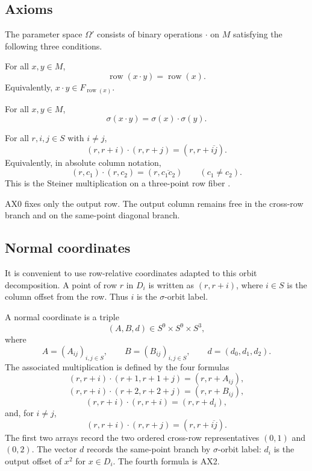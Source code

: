 \documentclass[11pt]{article}
\theoremstyle{definition}
\begin{document}
\subsection{Axioms}\label{axioms}

The parameter space \(\Omega'\) consists of binary operations \(\cdot\) on \(M\)
satisfying the following three conditions.

\begin{description}[leftmargin=3.2em,style=nextline]
\item[AX0, left-row output.]
For all \(x,y\in M\),
\[
\operatorname{row}(x\cdot y)=\operatorname{row}(x).
\]
Equivalently, \(x\cdot y\in F_{\operatorname{row}(x)}\).

\item[\(\sigma\)-equivariance.]
For all \(x,y\in M\),
\[
\sigma(x\cdot y)=\sigma(x)\cdot \sigma(y).
\]

\item[AX2, same-row off-diagonal Steiner rule.]
For all \(r,i,j\in S\) with \(i\ne j\),
\[
(r,r+i)\cdot(r,r+j)=(r,r+\overline{ij}).
\]
Equivalently, in absolute column notation,
\[
(r,c_1)\cdot(r,c_2)=(r,\overline{c_1c_2})
\qquad(c_1\ne c_2).
\]
This is the Steiner multiplication on a three-point row fiber
\cite{Pflugfelder1990,ColbournDinitz2007}.
\end{description}

AX0 fixes only the output row.  The output column remains free in the
cross-row branch and on the same-point diagonal branch.

\subsection{Normal coordinates}\label{normal-coordinates}

It is convenient to use row-relative coordinates adapted to this orbit
decomposition.  A point of row \(r\) in \(D_i\) is written as \((r,r+i)\),
where \(i\in S\) is the column offset from the row.  Thus \(i\) is the
\(\sigma\)-orbit label.

A normal coordinate is a triple
\[
(A,B,d)\in S^9\times S^9\times S^3,
\]
where
\[
A=(A_{ij})_{i,j\in S},
\qquad
B=(B_{ij})_{i,j\in S},
\qquad
 d=(d_0,d_1,d_2).
\]
The associated multiplication is defined by the four formulas
\[
(r,r+i)\cdot(r+1,r+1+j)=(r,r+A_{ij}),
\]
\[
(r,r+i)\cdot(r+2,r+2+j)=(r,r+B_{ij}),
\]
\[
(r,r+i)\cdot(r,r+i)=(r,r+d_i),
\]
and, for \(i\ne j\),
\[
(r,r+i)\cdot(r,r+j)=(r,r+\overline{ij}).
\]
The first two arrays record the two ordered cross-row representatives
\((0,1)\) and \((0,2)\).  The vector \(d\) records the same-point branch by
\(\sigma\)-orbit label: \(d_i\) is the output offset of \(x^2\) for
\(x\in D_i\).  The fourth formula is AX2.
\end{document}
